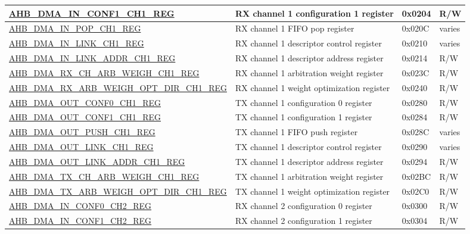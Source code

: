 \begin{longtable}{ | l | p{10cm} | p{1.3cm} | l | }
\hyperref[regdesc:AHBDMAINCONF1CHNREG]{AHB\_DMA\_IN\_CONF1\_CH1\_REG} & RX channel 1 configuration 1 register & 0x0204 & R/W \\ \hline
\hyperref[regdesc:AHBDMAINPOPCHNREG]{AHB\_DMA\_IN\_POP\_CH1\_REG} & RX channel 1 FIFO pop register & 0x020C & varies \\ \hline
\hyperref[regdesc:AHBDMAINLINKCHNREG]{AHB\_DMA\_IN\_LINK\_CH1\_REG} & RX channel 1 descriptor control register & 0x0210 & varies \\ \hline
\hyperref[regdesc:AHBDMAINLINKADDRCHNREG]{AHB\_DMA\_IN\_LINK\_ADDR\_CH1\_REG} & RX channel 1 descriptor address register & 0x0214 & R/W \\ \hline
\hyperref[regdesc:AHBDMARXCHARBWEIGHCHNREG]{AHB\_DMA\_RX\_CH\_ARB\_WEIGH\_CH1\_REG} & RX channel 1 arbitration weight register & 0x023C & R/W \\ \hline
\hyperref[regdesc:AHBDMARXARBWEIGHOPTDIRCHNREG]{AHB\_DMA\_RX\_ARB\_WEIGH\_OPT\_DIR\_CH1\_REG} & RX channel 1 weight optimization register & 0x0240 & R/W \\ \hline
\hyperref[regdesc:AHBDMAOUTCONF0CHNREG]{AHB\_DMA\_OUT\_CONF0\_CH1\_REG} & TX channel 1 configuration 0 register & 0x0280 & R/W \\ \hline
\hyperref[regdesc:AHBDMAOUTCONF1CHNREG]{AHB\_DMA\_OUT\_CONF1\_CH1\_REG} & TX channel 1 configuration 1 register & 0x0284 & R/W \\ \hline
\hyperref[regdesc:AHBDMAOUTPUSHCHNREG]{AHB\_DMA\_OUT\_PUSH\_CH1\_REG} & TX channel 1 FIFO push register & 0x028C & varies \\ \hline
\hyperref[regdesc:AHBDMAOUTLINKCHNREG]{AHB\_DMA\_OUT\_LINK\_CH1\_REG} & TX channel 1 descriptor control register & 0x0290 & varies \\ \hline
\hyperref[regdesc:AHBDMAOUTLINKADDRCHNREG]{AHB\_DMA\_OUT\_LINK\_ADDR\_CH1\_REG} & TX channel 1 descriptor address register & 0x0294 & R/W \\ \hline
\hyperref[regdesc:AHBDMATXCHARBWEIGHCHNREG]{AHB\_DMA\_TX\_CH\_ARB\_WEIGH\_CH1\_REG} & TX channel 1 arbitration weight register & 0x02BC & R/W \\ \hline
\hyperref[regdesc:AHBDMATXARBWEIGHOPTDIRCHNREG]{AHB\_DMA\_TX\_ARB\_WEIGH\_OPT\_DIR\_CH1\_REG} & TX channel 1 weight optimization register & 0x02C0 & R/W \\ \hline
\hyperref[regdesc:AHBDMAINCONF0CHNREG]{AHB\_DMA\_IN\_CONF0\_CH2\_REG} & RX channel 2 configuration 0 register & 0x0300 & R/W \\ \hline
\hyperref[regdesc:AHBDMAINCONF1CHNREG]{AHB\_DMA\_IN\_CONF1\_CH2\_REG} & RX channel 2 configuration 1 register & 0x0304 & R/W \\ \hline

\end{longtable}
